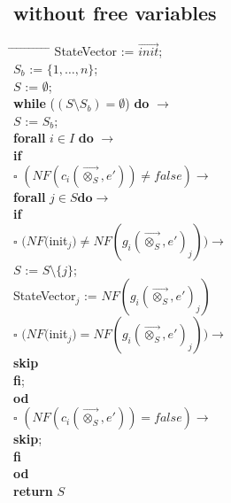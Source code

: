 \index{}\documentclass[a4paper,10pt]{article}
\theoremstyle{plain}
\theoremstyle{definition}
\newcommand{\ovr}{\overrightarrow}
\newcommand{\tb}{\textbf}
\newcommand{\ra}{$\rightarrow$}
\newcommand{\sq}{$\square$}
\begin{document}
\subsection{without free variables} \label{sec:alg}
\begin{tabbing} 
\hspace*{5.mm} \= \hspace*{5.mm} \= \hspace*{5.mm} \= \hspace*{5.mm} \= \hspace*{5.mm} \= \hspace*{5.mm}  \= \hspace*{5.mm}  \= \hspace*{5.mm}  \= \hspace*{5.mm} \= \hspace*{5.mm} \= \hspace*{5.mm}\kill
StateVector := $\ovr{init}$; \\
$S_b$ := $\lbrace 1, \ldots, n \rbrace$; \\
$S$ := $\emptyset$;\\ 
\tb{while}  ($ (S \setminus S_b) = \emptyset $) \tb{do} \ra \\
  \> $S$ := $S_b$; \\
  \> \tb{forall} $i \in I$ \tb{do} \ra \\
  \>	\>	\tb{if} \\
  \>	\>	\sq \> $(NF(c_i(\ovr{\otimes_S},e')) \not= false) \rightarrow$ \\
  \>	\>	\>  	\>  \tb{forall} $j \in S \tb{do} \rightarrow$ \\
  \>	\>	\>  	\>	\>  	    \tb{if} \\
  \>	\>	\>  	\>   	\>         $\square$  \> $(NF($init$_j) \neq NF(g_i(\ovr{\otimes_S}, e')_j)) \rightarrow$ \\
  \>	\>	\>  	\>    	\>       \>    \>       $S$ := $S\setminus \lbrace j \rbrace$;\\
  \> 	\>	\>	\>	\>	\>	\>	StateVector$_j$ := $NF(g_i(\ovr{\otimes_S}, e')_j)$\\
 \>	\>	\>  	\>    	\>        $\square$ \> $ (NF($init$_j) = NF(g_i(\ovr{\otimes_S}, e')_j)) \rightarrow$\\
  \>	\>	\> 	\>    	\>        \> \>  \tb{skip}\\	
  \>	\>	\> 	\> 	\>          \tb{fi}; \\
  \>	\>	\>	\> \tb{od}\\
  \>	\>	\sq 	\>  $(NF(c_i(\ovr{\otimes_S},e')) = false) \rightarrow$ \\
  \>	\>	\> 	\>\tb{skip};\\
  \>	\>	\tb{fi}\\
  \>	\tb{od} \\
 \tb{return} $S$
\end{tabbing} 
\end{document}

